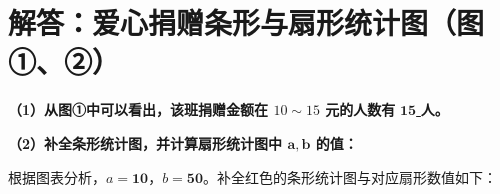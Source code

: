 

\section{解答：爱心捐赠条形与扇形统计图（图①、②）}

\vspace{0.6cm}

\textbf{（1）从图①中可以看出，该班捐赠金额在 $10\sim 15$ 元的人数有} \underline{\quad $\textbf{15}$ \quad} \textbf{人。}

\vspace{0.4cm}

\textbf{（2）补全条形统计图，并计算扇形统计图中 $\boldsymbol{a}, \boldsymbol{b}$ 的值：}

根据图表分析，$a = \boldsymbol{10}$，$b = \boldsymbol{50}$。补全红色的条形统计图与对应扇形数值如下：

\vspace{0.6cm}

